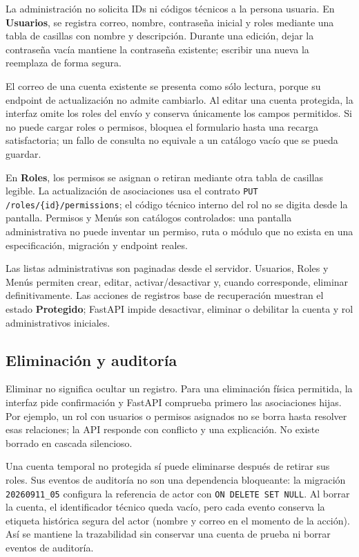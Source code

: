 \documentclass[11pt,letterpaper]{article}
\newcommand{\file}[1]{\texttt{#1}}
\begin{document}
La administración no solicita IDs ni códigos técnicos a la persona usuaria. En \textbf{Usuarios}, se registra correo, nombre, contraseña inicial y roles mediante una tabla de casillas con nombre y descripción. Durante una edición, dejar la contraseña vacía mantiene la contraseña existente; escribir una nueva la reemplaza de forma segura.

El correo de una cuenta existente se presenta como sólo lectura, porque su endpoint
de actualización no admite cambiarlo. Al editar una cuenta protegida, la interfaz
omite los roles del envío y conserva únicamente los campos permitidos. Si no puede
cargar roles o permisos, bloquea el formulario hasta una recarga satisfactoria;
un fallo de consulta no equivale a un catálogo vacío que se pueda guardar.

En \textbf{Roles}, los permisos se asignan o retiran mediante otra tabla de casillas legible. La actualización de asociaciones usa el contrato \file{PUT /roles/\{id\}/permissions}; el código técnico interno del rol no se digita desde la pantalla. Permisos y Menús son catálogos controlados: una pantalla administrativa no puede inventar un permiso, ruta o módulo que no exista en una especificación, migración y endpoint reales.

Las listas administrativas son paginadas desde el servidor. Usuarios, Roles y Menús permiten crear, editar, activar/desactivar y, cuando corresponde, eliminar definitivamente. Las acciones de registros base de recuperación muestran el estado \textbf{Protegido}; FastAPI impide desactivar, eliminar o debilitar la cuenta y rol administrativos iniciales.

\subsection{Eliminación y auditoría}

Eliminar no significa ocultar un registro. Para una eliminación física permitida, la interfaz pide confirmación y FastAPI comprueba primero las asociaciones hijas. Por ejemplo, un rol con usuarios o permisos asignados no se borra hasta resolver esas relaciones; la API responde con conflicto y una explicación. No existe borrado en cascada silencioso.

Una cuenta temporal no protegida sí puede eliminarse después de retirar sus roles. Sus eventos de auditoría no son una dependencia bloqueante: la migración \file{20260911\_05} configura la referencia de actor con \file{ON DELETE SET NULL}. Al borrar la cuenta, el identificador técnico queda vacío, pero cada evento conserva la etiqueta histórica segura del actor (nombre y correo en el momento de la acción). Así se mantiene la trazabilidad sin conservar una cuenta de prueba ni borrar eventos de auditoría.
\end{document}
